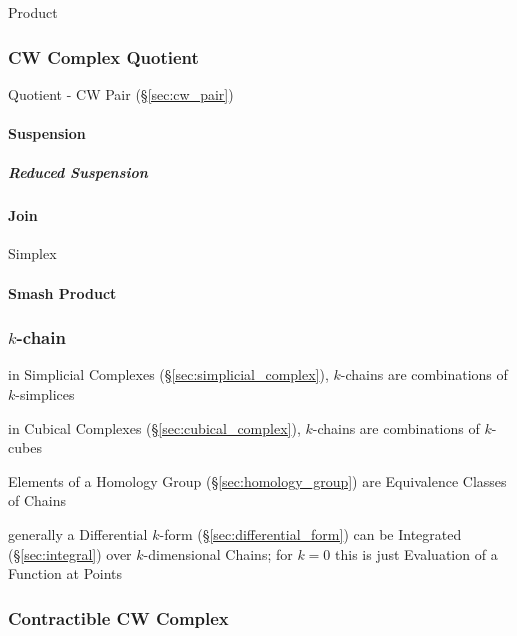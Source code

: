 Product



\subsubsection{CW Complex Quotient}\label{sec:cwcomplex_quotient}

Quotient - CW Pair (\S\ref{sec:cw_pair})



\paragraph{Suspension}\label{sec:suspension}\hfill

\subparagraph{Reduced Suspension}\label{sec:reduced_suspension}\hfill



\paragraph{Join}\label{sec:join}\hfill

Simplex %



\paragraph{Smash Product}\label{sec:smash_product}\hfill



\subsubsection{$k$-chain}\label{sec:k_chain}

in Simplicial Complexes (\S\ref{sec:simplicial_complex}), $k$-chains are
combinations of $k$-simplices

in Cubical Complexes (\S\ref{sec:cubical_complex}), $k$-chains are
combinations of $k$-cubes

Elements of a Homology Group (\S\ref{sec:homology_group}) are Equivalence
Classes of Chains

generally a Differential $k$-form (\S\ref{sec:differential_form}) can be
Integrated (\S\ref{sec:integral}) over $k$-dimensional Chains; for $k=0$ this is
just Evaluation of a Function at Points



\subsubsection{Contractible CW Complex}
\label{sec:contractible_cwcomplex}

